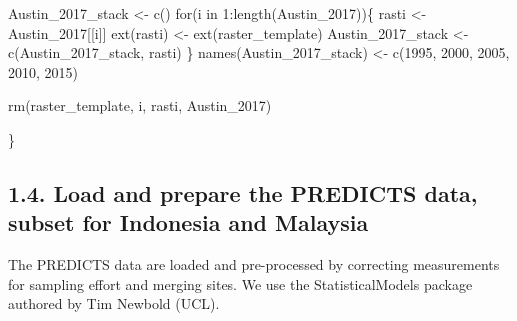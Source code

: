 \documentclass[
  letterpaper,
  DIV=11,
  numbers=noendperiod]{scrartcl}
\newenvironment{Shaded}{\begin{snugshade}}{\end{snugshade}}
\newcommand{\ControlFlowTok}[1]{\textcolor[rgb]{0.00,0.23,0.31}{#1}}
\newcommand{\DecValTok}[1]{\textcolor[rgb]{0.68,0.00,0.00}{#1}}
\newcommand{\FunctionTok}[1]{\textcolor[rgb]{0.28,0.35,0.67}{#1}}
\newcommand{\NormalTok}[1]{\textcolor[rgb]{0.00,0.23,0.31}{#1}}
\newcommand{\OtherTok}[1]{\textcolor[rgb]{0.00,0.23,0.31}{#1}}
\newcommand{\SpecialCharTok}[1]{\textcolor[rgb]{0.37,0.37,0.37}{#1}}
\newcommand{\StringTok}[1]{\textcolor[rgb]{0.13,0.47,0.30}{#1}}
\begin{document}
\begin{Shaded}
\begin{Highlighting}[]
\NormalTok{Austin\_2017\_stack }\OtherTok{\textless{}{-}} \FunctionTok{c}\NormalTok{()}
\ControlFlowTok{for}\NormalTok{(i }\ControlFlowTok{in} \DecValTok{1}\SpecialCharTok{:}\FunctionTok{length}\NormalTok{(Austin\_2017))\{}
\NormalTok{  rasti }\OtherTok{\textless{}{-}}\NormalTok{ Austin\_2017[[i]]}
  \FunctionTok{ext}\NormalTok{(rasti) }\OtherTok{\textless{}{-}} \FunctionTok{ext}\NormalTok{(raster\_template)}
\NormalTok{  Austin\_2017\_stack }\OtherTok{\textless{}{-}} \FunctionTok{c}\NormalTok{(Austin\_2017\_stack, rasti)}
\NormalTok{\}}
\FunctionTok{names}\NormalTok{(Austin\_2017\_stack) }\OtherTok{\textless{}{-}} \FunctionTok{c}\NormalTok{(}\StringTok{\textquotesingle{}1995\textquotesingle{}}\NormalTok{, }\StringTok{\textquotesingle{}2000\textquotesingle{}}\NormalTok{, }\StringTok{\textquotesingle{}2005\textquotesingle{}}\NormalTok{, }\StringTok{\textquotesingle{}2010\textquotesingle{}}\NormalTok{, }\StringTok{\textquotesingle{}2015\textquotesingle{}}\NormalTok{)}

\FunctionTok{rm}\NormalTok{(raster\_template, i, rasti, Austin\_2017)}

\NormalTok{\}}
\end{Highlighting}
\end{Shaded}

\hypertarget{load-and-prepare-the-predicts-data-subset-for-indonesia-and-malaysia}{%
\subsection{1.4. Load and prepare the PREDICTS data, subset for
Indonesia and
Malaysia}\label{load-and-prepare-the-predicts-data-subset-for-indonesia-and-malaysia}}

The PREDICTS data are loaded and pre-processed by correcting
measurements for sampling effort and merging sites. We use the
StatisticalModels package authored by Tim Newbold (UCL).
\end{document}
